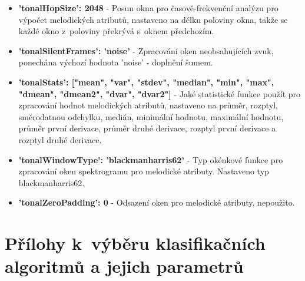 \begin{itemize}
    \item \textbf{'tonalHopSize': 2048} - Posun okna pro časově-frekvenční analýzu pro výpočet melodických atributů, nastaveno na délku poloviny okna, takže se každé okno z~poloviny překrývá s~oknem předchozím.
    \item \textbf{'tonalSilentFrames': 'noise'} - Zpracování oken neobsahujících zvuk, ponechána výchozí hodnota 'noise' - doplnění šumem.
    \item \textbf{'tonalStats': ["mean", "var", "stdev", "median", "min", "max", "dmean", "dmean2", "dvar", "dvar2"]} - Jaké statistické funkce použít pro zpracování hodnot melodických atributů, nastaveno na průměr, rozptyl, směrodatnou odchylku, medián, minimální hodnotu, maximální hodnotu, průměr první derivace, průměr druhé derivace, rozptyl první derivace a rozptyl druhé derivace.
    \item \textbf{'tonalWindowType': 'blackmanharris62'} - Typ okénkové funkce pro zpracování oken spektrogramu pro melodické atributy. Nastaveno typ blackmanharris62.
    \item \textbf{'tonalZeroPadding': 0} - Odsazení oken pro melodické atributy, nepoužito.
\end{itemize}

\chapter{Přílohy k~výběru klasifikačních algoritmů a jejich parametrů}
\label{prilohy_k_vyberu_klasifikacnich_algoritmu_a_jejich_parametru}

